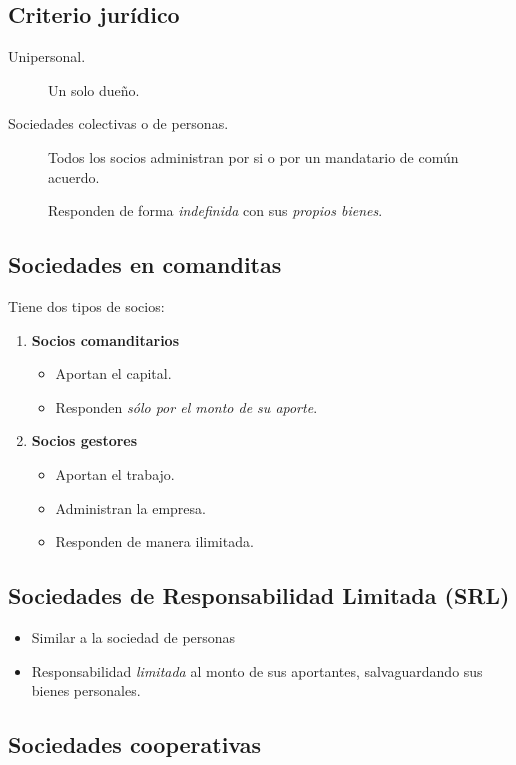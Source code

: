 \documentclass[12pt, spanish, a5paper]{article}
\begin{document}
\subsection{Criterio jurídico}

\begin{description}
	\item[Unipersonal.] Un solo dueño.
	\item[Sociedades colectivas o de personas.] Todos los socios administran por si o por un mandatario de común acuerdo.

	Responden de forma \emph{indefinida} con sus \emph{propios bienes}.
	
\end{description}

\subsection{Sociedades en comanditas}
Tiene dos tipos de socios:
\begin{enumerate}
	\item \textbf{Socios comanditarios}
	\begin{itemize}
		\item Aportan el capital.
		\item Responden \emph{sólo por el monto de su aporte}.
	\end{itemize}
	\item \textbf{Socios gestores}
	\begin{itemize}
		\item Aportan el trabajo.
		\item Administran la empresa.
		\item Responden de manera ilimitada.
	\end{itemize}
\end{enumerate}

\subsection{Sociedades de Responsabilidad Limitada (SRL)}

\begin{itemize}
	\item Similar a la sociedad de personas
	\item Responsabilidad \emph{limitada} al monto de sus aportantes, salvaguardando sus bienes personales.
\end{itemize}

\subsection{Sociedades cooperativas}
\end{document}
